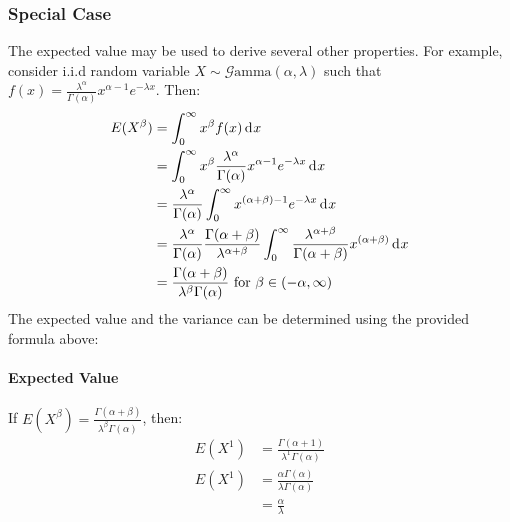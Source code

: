 \documentclass[12pt]{article}
\newcommand{\G}{\mathcal{G}}
\begin{document}
\subsubsection{Special Case}
The expected value may be used to derive several other properties. For example, consider i.i.d random variable
$X\sim\G\text{amma}(\alpha, \lambda)$ such that $f(x) = \frac{\lambda^\alpha}{\Gamma(\alpha)}x^{\alpha-1}e^{-\lambda x}$.
Then:
\begin{equation}
	\begin{split}
		E(X^\beta)	&=	\int^\infty_0 x^\beta f(x)\mathop{}\!\mathrm{d^{}}x\\
					&=	\int^\infty_0 x^\beta \frac{\lambda^\alpha}{\Gamma(\alpha)}x^{\alpha-1}e^{-\lambda x}\mathop{}\!\mathrm{d^{}}x\\
					&=	\frac{\lambda^\alpha}{\Gamma(\alpha)}\int^\infty_0 x^{(\alpha+\beta)-1}e^{-\lambda x}\mathop{}\!\mathrm{d^{}}x\\
					&=	\frac{\lambda^\alpha}{\Gamma(\alpha)}\frac{\Gamma(\alpha+\beta)}{\lambda^{\alpha+\beta}}\int^\infty_0 \frac{\lambda^{\alpha+\beta}}{\Gamma(\alpha+\beta)}x^{(\alpha+\beta)}\mathop{}\!\mathrm{d^{}}x\\
					&=	\frac{\Gamma(\alpha+\beta)}{\lambda^\beta \Gamma(\alpha)}\text{ for }\beta\in (-\alpha, \infty)
	\end{split}
\end{equation}
The expected value and the variance can be determined using the provided formula above:
\paragraph{Expected Value}
If $E(X^\beta) = \frac{\Gamma(\alpha+\beta)}{\lambda^\beta \Gamma(\alpha)}$, then:
\begin{equation}
	\begin{split}
		E(X^1)	&=	\frac{\Gamma(\alpha+1)}{\lambda^1 \Gamma(\alpha)}\\
		E(X^1)	&=	\frac{\alpha\Gamma(\alpha)}{\lambda\Gamma(\alpha)}\\
				&=	\frac{\alpha}{\lambda}
	\end{split}
\end{equation}
\end{document}
